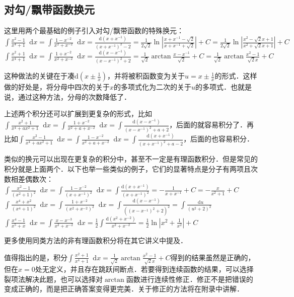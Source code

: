 \documentclass{ctexbook}
\newcommand*{\dif}{\mathop{}\!\mathrm{d}}
\begin{document}
\subsection{对勾/飘带函数换元}
这里用两个最基础的例子引入对勾/飘带函数的特殊换元：\\
$\int\frac{x^{2}-1}{x^{4}+1}\dif{x}=\int\frac{1-x^{-2}}{x^{2}+x^{-2}}\dif{x}=\frac{\mathrm{d}\left(x+x^{-1}\right)}{\left(x+x^{-1}\right)^{2}-2}=\frac{1}{2\sqrt{2}}\ln{|\frac{x+x^{-1}-\sqrt{2}}{x+x^{-1}+\sqrt{2}}|}+C=\frac{1}{2\sqrt{2}}\ln{|\frac{x^{2}-\sqrt{2}x+1}{x^{2}+\sqrt{2}x+1}|}+C$\\
$\int\frac{x^{2}+1}{x^{4}+1}\dif{x}=\int\frac{1+x^{-2}}{x^{2}+x^{-2}}\dif{x}=\frac{\mathrm{d}\left(x-x^{-1}\right)}{\left(x-x^{-1}\right)^{2}+2}=\frac{1}{\sqrt{2}}\arctan{\frac{x-x^{-1}}{\sqrt{2}}}+C=\frac{1}{\sqrt{2}}\arctan{\frac{x^{2}-1}{\sqrt{2}x}}+C$\par
这种做法的关键在于凑$\mathrm{d}\left(x\pm\frac{1}{x}\right)$，并将被积函数变为关于$u=x\pm\frac{1}{x}$的形式．这样做的好处是，将分母中四次的关于$x$的多项式化为二次的关于$u$的多项式．也就是说，通过这种方法，分母的次数降低了．\par
上述两个积分还可以扩展到更复杂的形式，比如$\int\frac{x^{2}+1}{x^{4}+ax^{2}+1}\dif{x}=\int\frac{1+x^{-2}}{x^{2}+a+x^{-2}}\dif{x}=\int\frac{\mathrm{d}\left(x-x^{-1}\right)}{\left(x-x^{-1}\right)^{2}+a+2}$，后面的就容易积分了．再比如$\int\frac{x^{2}-1}{x^{4}+ax^{2}+1}\dif{x}=\int\frac{1-x^{-2}}{x^{2}+a+x^{-2}}\dif{x}=\int\frac{\mathrm{d}\left(x+x^{-1}\right)}{\left(x+x^{-1}\right)^{2}+a-2}$，后面的也容易积分．\par
类似的换元可以出现在更复杂的积分中，甚至不一定是有理函数积分．但是常见的积分就是上面两个．以下也举一些类似的例子，它们的显著特点是分子有两项且次数相差偶数次：\\
$\int\frac{x^{2}-1}{\left(x^{2}+1\right)^{2}}\dif{x}=\int\frac{1-x^{-2}}{\left(x+x^{-1}\right)^{2}}\dif{x}=\int\frac{\mathrm{d}\left(x+x^{-1}\right)}{\left(x+x^{-1}\right)^{2}}=-\frac{1}{x+x^{-1}}+C=-\frac{x}{x^{2}+1}+C$\\
$\int\frac{x^{4}+x^{2}}{\left(x^{4}+1\right)^{2}}\dif{x}=\int\frac{1+x^{-2}}{\left(x^{2}+x^{-2}\right)^{2}}\dif{x}=\int\frac{\mathrm{d}\left(x-x^{-1}\right)}{\left(\left(x-x^{-1}\right)^{2}+2\right)^{2}}=\int\frac{\dif{u}}{\left(u^{2}+2\right)^{2}}$\\
$\int\frac{x^{4}-1}{x^{5}+x}\dif{x}=\int\frac{x-x^{-3}}{x^{2}+x^{-2}}\dif{x}=\frac{1}{2}\int\frac{\mathrm{d}\left(x^{2}+x^{-2}\right)}{x^{2}+x^{-2}}=\frac{1}{2}\ln{|x^{2}+\frac{1}{x^{2}}|}+C$\par
更多使用同类方法的非有理函数积分将在其它讲义中提及．\par
值得指出的是，积分$\int\frac{x^{2}+1}{x^{4}+1}\dif{x}=\frac{1}{\sqrt{2}}\arctan{\frac{x^{2}-1}{\sqrt{2}x}}+C$得到的结果虽然是正确的，但在$x=0$处无定义，并且存在跳跃间断点．若要得到连续函数的结果，可以选择裂项法解决此题，也可以选择对$\arctan$函数进行连续性修正．修正不是把错误的变成正确的，而是把正确答案变得更完美．关于修正的方法将在附录中讲解．\par
\end{document}
